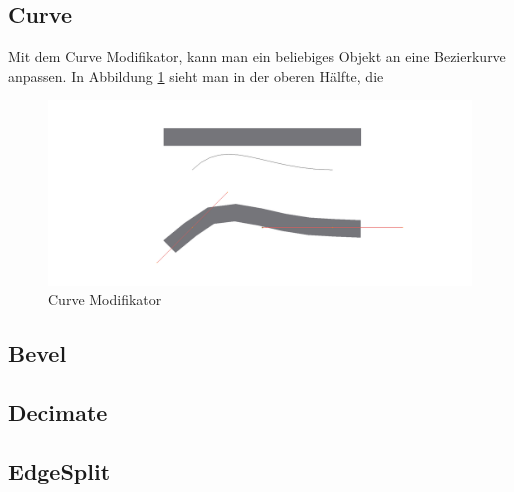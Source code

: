 \subsection{Curve}
\citep{blender:curve_modifier} Mit dem Curve Modifikator, kann man ein beliebiges Objekt an eine Bezierkurve anpassen. In Abbildung \ref{modifikatoren:image4} sieht man
in der oberen Hälfte, die
\begin{figure}[h]
    \centering
    \includegraphics[width=.8\textwidth]{images/Modifikatoren-Curve.png}
    \caption{Curve Modifikator}
    \label{modifikatoren:image4}
\end{figure}

\subsection{Bevel}
\subsection{Decimate}
\subsection{EdgeSplit}
